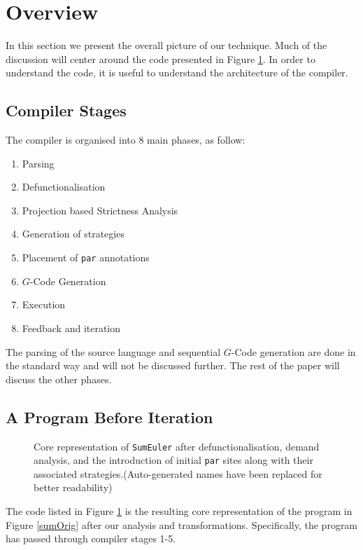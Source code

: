 \section{Overview}
\label{sec:overview}

In this section we present the overall picture of our technique. Much of the
discussion will center around the code presented in Figure \ref{sumLast}. In
order to understand the code, it is useful to understand the architecture of the
compiler.

\subsection{Compiler Stages}
The compiler is organised into 8 main phases, as follow:

\begin{enumerate}
    \item Parsing
    \item Defunctionalisation
    \item Projection based Strictness Analysis
    \item Generation of strategies
    \item Placement of \verb-par- annotations
    \item $G$-Code Generation
    \item Execution
    \item Feedback and iteration
\end{enumerate}

The parsing of the source language and sequential $G$-Code generation are done
in the standard way and will not be discussed further. The rest of the paper will
discuss the other phases.

\subsection{A Program Before Iteration}

\begin{figure}[t!]
  
\caption{Core representation of \texttt{SumEuler} after defunctionalisation, demand
         analysis, and the introduction of initial \texttt{par} sites along
         with their associated strategies.(Auto-generated names have been
         replaced for better readability)}
\label{sumLast}
\end{figure}

The code listed in Figure \ref{sumLast} is the resulting core representation
of the program in Figure \ref{sumOrig} after our analysis and transformations.
Specifically, the program has passed through compiler stages 1-5.

